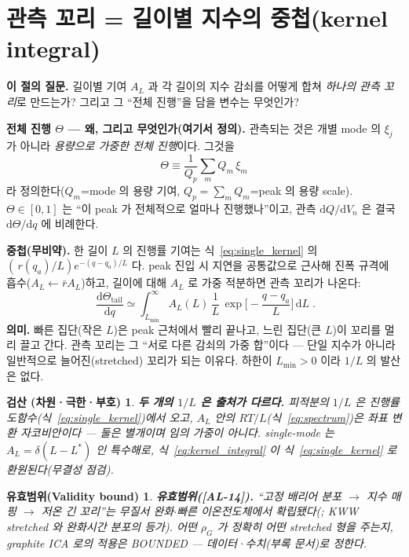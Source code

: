 \documentclass[11pt,a4paper]{article}
\newtheorem*{boundbox}{유효범위(Validity bound)}
\newtheorem*{verifybox}{검산 (차원·극한·부호)}
\newcommand{\dd}{\mathrm{d}}
\newcommand{\AL}[1]{\textsf{[AL-#1]}}
\begin{document}
\section{관측 꼬리 = 길이별 지수의 중첩(kernel integral)}\label{sec:kernel}
\textbf{이 절의 질문.} 길이별 기여 $A_L$ 과 각 길이의 지수 감쇠를 어떻게 합쳐 \emph{하나의 관측 꼬리}로
만드는가? 그리고 그 ``전체 진행''을 담을 변수는 무엇인가?

\textbf{전체 진행 $\Theta$ — 왜, 그리고 무엇인가(여기서 정의).} 관측되는 것은 개별 mode 의 $\xi_j$ 가 아니라
\emph{용량으로 가중한 전체 진행}이다. 그것을
\begin{equation}
\Theta\equiv\frac{1}{Q_p}\sum_m Q_m\,\xi_m
\label{eq:Theta_def}
\end{equation}
라 정의한다($Q_m$=mode 의 용량 기여, $Q_p=\sum_m Q_m$=peak 의 용량 scale). $\Theta\in[0,1]$ 는 ``이 peak 가
전체적으로 얼마나 진행했나''이고, 관측 $\dd Q/\dd V_n$ 은 결국 $\dd\Theta/\dd q$ 에 비례한다.

\textbf{중첩(무비약).} 한 길이 $L$ 의 진행률 기여는 식~\eqref{eq:single_kernel} 의 $(\,r(q_a)/L)e^{-(q-q_a)/L}$
다. peak 진입 시 지연을 공통값으로 근사해 진폭 규격에 흡수($A_L\!\leftarrow\!\bar r A_L$)하고, 길이에 대해
$A_L$ 로 가중 적분하면 관측 꼬리가 나온다:
\begin{equation}
\boxed{\;\frac{\dd\Theta_\mathrm{tail}}{\dd q}\simeq\int_{L_{\min}}^{\infty} A_L(L)\,\frac1L\,
\exp\!\Big[-\frac{q-q_a}{L}\Big]\,\dd L\;.}
\label{eq:kernel_integral}
\end{equation}
\textbf{의미.} 빠른 집단(작은 $L$)은 peak 근처에서 빨리 끝나고, 느린 집단(큰 $L$)이 꼬리를 멀리 끌고 간다.
관측 꼬리는 그 ``서로 다른 감쇠의 가중 합''이다 — 단일 지수가 아니라 일반적으로 늘어진(stretched) 꼬리가 되는
이유다. 하한이 $L_{\min}>0$ 이라 $1/L$ 의 발산은 없다.

\begin{verifybox}
\textbf{두 개의 $1/L$ 은 출처가 다르다.} 피적분의 $1/L$ 은 진행률 도함수(식~\eqref{eq:single_kernel})에서
오고, $A_L$ 안의 $RT/L$(식~\eqref{eq:spectrum})은 좌표 변환 자코비안이다 — 둘은 별개이며 임의 가중이 아니다.
single-mode 는 $A_L=\delta(L-L^\ast)$ 인 특수해로, 식~\eqref{eq:kernel_integral} 이 식~\eqref{eq:single_kernel}
로 환원된다(무결성 점검).
\end{verifybox}
\begin{boundbox}
\textbf{유효범위(\AL{14}).} ``고정 배리어 분포 $\to$ 지수 매핑 $\to$ 저온 긴 꼬리''는 무질서 완화$\cdot$빠른
이온전도체에서 확립됐다(\cite{svare2000,johnston2006,lindsey1980}; KWW stretched 와 완화시간 분포의 등가).
어떤 $\rho_G$ 가 \emph{정확히} 어떤 stretched 형을 주는지, graphite ICA 로의 적용은 BOUNDED — 데이터·수치(부록
문서)로 정한다.
\end{boundbox}
\end{document}

